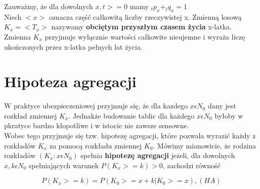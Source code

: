 \documentclass{article}
\begin{document}
Zauważmy, że dla dowolnych $ x,t >= 0  $ mamy $ _tp_x + _tq_x = 1 $\\

Niech $ < x > $ oznacza część całkowitą liczby rzeczywistej x. Zmienną losową $ K_x = < T_x > $ nazywamy \textbf{obciętym przyszłym czasem życia} x-latka. Zmienna $ K_x $ przyjmuje wyłącznie wartości całkowite nieujemne i wyraża liczę ukończonych przez x-latka pełnych lat życia. \\

\newpage

\section{Hipoteza agregacji}

W praktyce ubezpieczeniowej przyjmuje się, że dla kazdego $ x \epsilon N_0 $ dany jest rozkład zmiennej $ K_x $. Jednakże budowanie tablic dla każdego $  x \epsilon N_0$ byłoby w pkratyce bardzo kłopotliwe i w istocie nie zawsze sensowne.\\

Wobec tego przyjmuje się tzw. hipotezę agregacji, które pozwala wyrazić każdy z rozkładów $ K_x $ za pomocą rozkładu zmiennej $ K_0 $. Mówimy mianowicie, że rodzina rozkładów $ (K_x : x \epsilon N_0) $ spełnia \textbf{hipotezę agregacji} jeżeli, dla dowolnych $ x,k \epsilon N_0 $ spełniających warunek $ P(K_x >= k) > 0 $, zachodzi równość

\begin{center}
	\begin{equation}
		P(K_x >= k) = P(K_0 >= x + k|K_0 >= x), (HA)
	\end{equation}
\end{center}\\
\end{document}
